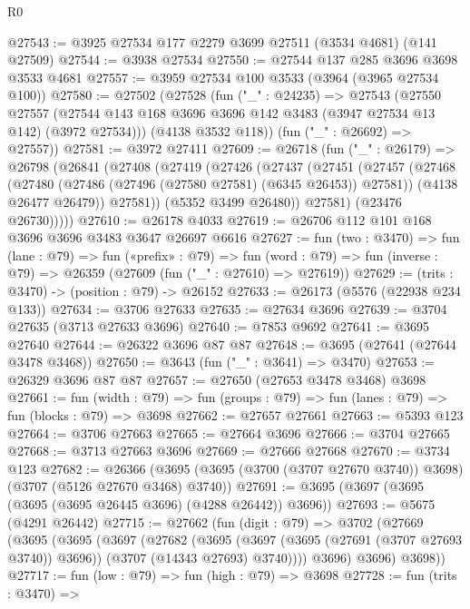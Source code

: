 \begin{lexlean}{R0}
\begin{coremodule}
@27543 := @3925 @27534 @177 @2279 @3699 @27511 (@3534 @4681) (@141 @27509)
@27544 := @3938 @27534
@27550 := @27544 @137 @285 @3696 @3698 @3533 @4681
@27557 := @3959 @27534 @100 @3533 (@3964 (@3965 @27534 @100))
@27580 := @27502
    (@27528
      (fun ("_" : @24235) =>
      @27543
        (@27550
          @27557
          (@27544 @143 @168 @3696 @3696 @142 @3483 (@3947 @27534 @13 @142) (@3972 @27534)))
        (@4138 @3532 @118))
      (fun ("_" : @26692) => @27557))
@27581 := @3972 @27411
@27609 := @26718
    (fun ("_" : @26179) =>
    @26798
      (@26841
        (@27408
          (@27419
            (@27426
              (@27437
                (@27451
                  (@27457
                    (@27468
                      (@27480 (@27486 (@27496 (@27580 @27581) (@6345 @26453)) @27581))
                      (@4138 @26477 @26479))
                    @27581))
                (@5352 @3499 @26480))
              @27581)
            (@23476 @26730)))))
@27610 := @26178 @4033
@27619 := @26706 @112 @101 @168 @3696 @3696 @3483 @3647 @26697 @6616
@27627 := fun (two : @3470) =>
  fun (lane : @79) =>
  fun («prefix» : @79) =>
  fun (word : @79) => fun (inverse : @79) => @26359 (@27609 (fun ("_" : @27610) => @27619))
@27629 := (trits : @3470) -> (position : @79) -> @26152
@27633 := @26173 (@5576 (@22938 @234 @133))
@27634 := @3706 @27633
@27635 := @27634 @3696
@27639 := @3704 @27635 (@3713 @27633 @3696)
@27640 := @7853 @9692
@27641 := @3695 @27640
@27644 := @26322 @3696 @87 @87
@27648 := @3695 (@27641 (@27644 @3478 @3468))
@27650 := @3643 (fun ("_" : @3641) => @3470)
@27653 := @26329 @3696 @87 @87
@27657 := @27650 (@27653 @3478 @3468) @3698
@27661 := fun (width : @79) =>
  fun (groups : @79) => fun (lanes : @79) => fun (blocks : @79) => @3698
@27662 := @27657 @27661
@27663 := @5393 @123
@27664 := @3706 @27663
@27665 := @27664 @3696
@27666 := @3704 @27665
@27668 := @3713 @27663 @3696
@27669 := @27666 @27668
@27670 := @3734 @123
@27682 := @26366
    (@3695 (@3695 (@3700 (@3707 @27670 @3740)) @3698) (@3707 (@5126 @27670 @3468) @3740))
@27691 := @3695 (@3697 (@3695 (@3695 (@3695 @26445 @3696) (@4288 @26442)) @3696))
@27693 := @5675 (@4291 @26442)
@27715 := @27662
    (fun (digit : @79) =>
    @3702
      (@27669
        (@3695
          (@3695
            (@3697
              (@27682
                (@3695
                  (@3697 (@3695 (@27691 (@3707 @27693 @3740)) @3696))
                  (@3707 (@14343 @27693) @3740))))
            @3696)
          @3696)
        @3698))
@27717 := fun (low : @79) => fun (high : @79) => @3698
@27728 := fun (trits : @3470) =>

\end{coremodule}
\end{lexlean}
